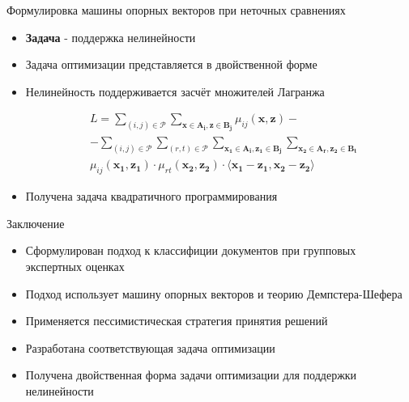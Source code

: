 \documentclass[11pt]{beamer}
\newcommand{\Rho}{%
	\mathcal{P}%
}
\begin{document}
\begin{frame}{Формулировка машины опорных векторов при неточных сравнениях}

\begin{itemize}
	\item \textbf{Задача} - поддержка нелинейности
	\item Задача оптимизации представляется в двойственной форме
	\item Нелинейность поддерживается засчёт множителей Лагранжа
	\begin{center}
\begin{eqnarray*}
&L = \sum \limits_{(i, j) \in \Rho} \sum \limits_{\mathbf{x} \in \mathbf{A_i}, \mathbf{z} \in \mathbf{B_j}} \mu_{ij} (\mathbf{x}, \mathbf{z}) - \\
&- \sum \limits_{(i, j) \in \Rho} \sum \limits_{(r, t) \in \Rho} \sum \limits_{\mathbf{x_1} \in \mathbf{A_i}, \mathbf{z_1} \in \mathbf{B_j}} \sum \limits_{\mathbf{x_2} \in \mathbf{A_r}, \mathbf{z_2} \in \mathbf{B_t}} \\
&\mu_{ij} (\mathbf{x_1}, \mathbf{z_1}) \cdot \mu_{rt} (\mathbf{x_2}, \mathbf{z_2}) \cdot \langle \mathbf{x_1} - \mathbf{z_1}, \mathbf{x_2} - \mathbf{z_2} \rangle
\end{eqnarray*}
	\end{center} \linebreak
	\item Получена задача квадратичного программирования
\end{itemize}

\end{frame}
\begin{frame}{Заключение}

\begin{itemize}
	\item Сформулирован подход к классифиции документов при групповых экспертных оценках
	\item Подход использует машину опорных векторов и теорию Демпстера-Шефера
	\item Применяется пессимистическая стратегия принятия решений
	\item Разработана соответствующая задача оптимизации
	\item Получена двойственная форма задачи оптимизации для поддержки нелинейности
\end{itemize}

\end{frame}
\end{document}

